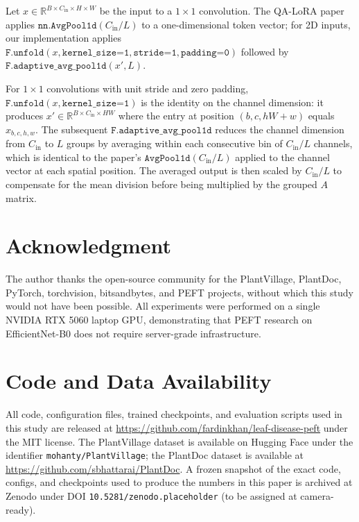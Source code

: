 \documentclass[conference]{IEEEtran}
\begin{document}
Let $x \in \mathbb{R}^{B\times C_{\text{in}}\times H\times W}$ be the input to a $1\times 1$ convolution. The QA-LoRA paper applies $\texttt{nn.AvgPool1d}(C_{\text{in}}/L)$ to a one-dimensional token vector; for 2D inputs, our implementation applies $\texttt{F.unfold}(x, \texttt{kernel\_size=1}, \texttt{stride=1}, \texttt{padding=0})$ followed by $\texttt{F.adaptive\_avg\_pool1d}(x', L)$.

For $1\times 1$ convolutions with unit stride and zero padding, $\texttt{F.unfold}(x, \texttt{kernel\_size=1})$ is the identity on the channel dimension: it produces $x' \in \mathbb{R}^{B\times C_{\text{in}}\times H W}$ where the entry at position $(b, c, hW+w)$ equals $x_{b, c, h, w}$. The subsequent $\texttt{F.adaptive\_avg\_pool1d}$ reduces the channel dimension from $C_{\text{in}}$ to $L$ groups by averaging within each consecutive bin of $C_{\text{in}}/L$ channels, which is identical to the paper's $\texttt{AvgPool1d}(C_{\text{in}}/L)$ applied to the channel vector at each spatial position. The averaged output is then scaled by $C_{\text{in}}/L$ to compensate for the mean division before being multiplied by the grouped $A$ matrix.

\section*{Acknowledgment}
The author thanks the open-source community for the PlantVillage, PlantDoc, PyTorch, torchvision, bitsandbytes, and PEFT projects, without which this study would not have been possible. All experiments were performed on a single NVIDIA RTX 5060 laptop GPU, demonstrating that PEFT research on EfficientNet-B0 does not require server-grade infrastructure.

\section*{Code and Data Availability}
All code, configuration files, trained checkpoints, and evaluation scripts used in this study are released at \url{https://github.com/fardinkhan/leaf-disease-peft} under the MIT license. The PlantVillage dataset is available on Hugging Face under the identifier \texttt{mohanty/PlantVillage}; the PlantDoc dataset is available at \url{https://github.com/sbhattarai/PlantDoc}. A frozen snapshot of the exact code, configs, and checkpoints used to produce the numbers in this paper is archived at Zenodo under DOI \texttt{10.5281/zenodo.placeholder} (to be assigned at camera-ready).
\end{document}
